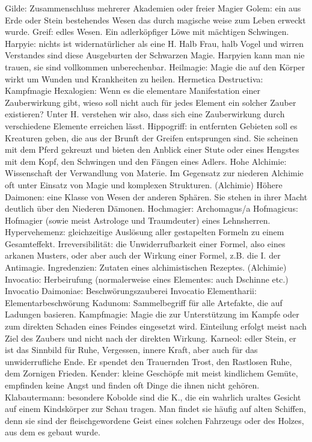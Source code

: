 \documentclass[a5paper,8pt]{book}
\begin{document}
Gilde: Zusammenschluss mehrerer Akademien oder freier Magier
Golem: ein aus Erde oder Stein bestehendes Wesen das durch magische weise zum Leben erweckt wurde.
Greif: edles Wesen. Ein adlerköpfiger Löwe mit mächtigen Schwingen. 
Harpyie: nichts ist widernatürlicher als eine H. Halb Frau, halb Vogel und wirren Verstandes sind diese Ausgeburten der Schwarzen Magie. Harpyien kann man nie trauen, sie sind vollkommen unberechenbar.
Heilmagie: Magie die auf den Körper wirkt um Wunden und Krankheiten zu heilen.
Hermetica Destructiva: \textit{}Kampfmagie
Hexalogien: Wenn es die elementare Manifestation einer Zauberwirkung gibt, wieso soll nicht auch für jedes \textit{}Element ein solcher Zauber existieren? Unter H. verstehen wir also, dass sich eine Zauberwirkung durch verschiedene Elemente erreichen lässt.
Hippogriff: in entfernten Gebieten soll es Kreaturen geben, die aus der Brunft der Greifen entsprungen sind. Sie scheinen mit dem Pferd gekreuzt und bieten den Anblick einer Stute oder eines Hengstes mit dem Kopf, den Schwingen und den Fängen eines Adlers.
Hohe Alchimie: Wissenschaft der Verwandlung von Materie. Im Gegensatz zur \textit{}niederen Alchimie oft unter Einsatz von Magie und komplexen Strukturen. (\textit{}Alchimie)
Höhere Daimonen: eine Klasse von Wesen der anderen Sphären. Sie stehen in ihrer Macht deutlich über den \textit{}Niederen Dämonen.
Hochmagier: \textit{}Archomagus/a
Hofmagicus: Hofmagier (sowie meist Astrologe und Traum­deuter) eines Lehnsherren.
Hypervehemenz: gleichzeitige Auslösung aller gestapelten Formeln zu einem Gesamteffekt.
Irreversibilität: die Unwiderrufbarkeit einer Formel, also eines arkanen Musters, oder aber auch der Wirkung einer Formel, z.B. die I. der \textit{}Antimagie.
Ingredenzien: Zutaten eines alchimistischen Rezeptes. (\textit{}Alchimie)
Invocatio: Herbeirufung (normalerweise eines Elementes: auch \textit{}Dschinne etc.)
Invocatio Daimoniae: \textit{}Beschwörungszauberei
Invocatio Elementharii: \textit{}Elementarbeschwörung
Kadunom: Sammelbegriff für alle Artefakte, die auf Ladungen basieren.
Kampfmagie: Magie die zur Unterstützung im Kampfe oder zum direkten Schaden eines Feindes eingesetzt wird. Einteilung erfolgt meist nach Ziel des Zaubers und nicht nach der direkten Wirkung.
Karneol: edler Stein, er ist das Sinn­bild für Ruhe, Vergessen, innere Kraft, aber auch für das unwiderrufliche Ende. Er spendet den Trauernden Trost, den Rastlosen Ruhe, dem Zornigen Frieden.
Kender: kleine Geschöpfe mit meist kindlichem Gemüte, empfinden keine Angst und finden oft Dinge die ihnen nicht gehören.
Klabautermann: besondere \textit{}Kobolde sind die K., die ein wahrlich uraltes Gesicht auf einem Kindskörper zur Schau tragen. Man findet sie häufig auf alten Schiffen, denn sie sind der fleischgewordene Geist eines solchen Fahrzeugs oder des Holzes, aus dem es gebaut wurde.
\end{document}
